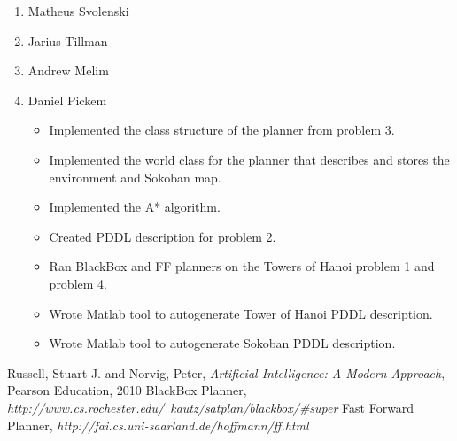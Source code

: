 \documentclass[12pt]{article}
\begin{document}
\begin{enumerate}
  \item Matheus Svolenski
  \item Jarius Tillman
  \item Andrew Melim
  \item Daniel Pickem
    \begin{itemize}
     \item Implemented the class structure of the planner from problem 3.
     \item Implemented the world class for the planner that describes and stores the environment and Sokoban map.
     \item Implemented the A* algorithm.
     \item Created PDDL description for problem 2.
     \item Ran BlackBox and FF planners on the Towers of Hanoi problem 1 and problem 4.
     \item Wrote Matlab tool to autogenerate Tower of Hanoi PDDL description.
     \item Wrote Matlab tool to autogenerate Sokoban PDDL description.
    \end{itemize}
\end{enumerate}

\begin{thebibliography}{50}
   Russell, Stuart J. and Norvig, Peter, \textsl{Artificial Intelligence: A Modern Approach}, Pearson Education, 2010
   BlackBox Planner, \textsl{http://www.cs.rochester.edu/~kautz/satplan/blackbox/\#super}
   Fast Forward Planner, \textsl{http://fai.cs.uni-saarland.de/hoffmann/ff.html}
\end{thebibliography}
\end{document}
